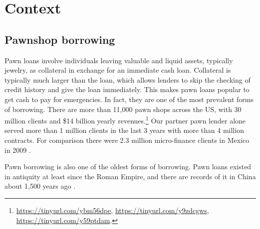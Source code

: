 \documentclass[oneside,11pt]{article}
\begin{document}


\section{Context} \label{context}

\subsection{Pawnshop borrowing}
    
Pawn loans involve individuals leaving valuable and liquid assets, typically jewelry, as collateral in exchange for an immediate cash loan. Collateral is typically much larger than the loan, which allows lenders to skip the checking of credit history and give the loan immediately. This makes pawn loans popular to get cash to pay for emergencies. In fact, they are one of the most prevalent forms of borrowing. There are more than 11,000 pawn shops across the US, with 30 million clients and \$14 billion yearly revenues.\footnote{\url{https://tinyurl.com/ybm56dpe}, \url{https://tinyurl.com/y9zdcgws}, \url{https://tinyurl.com/y59ptdam}.} Our partner pawn lender alone served more than 1 million clients in the last 3 years with more than 4 million contracts. For comparison there were 2.3 million micro-finance clients in Mexico in 2009 \citep{Pedroza:2010}. 

Pawn borrowing is also one of the oldest forms of borrowing. Pawn loans existed in antiquity at least since the Roman Empire, and there are records of it in China about 1,500 years ago \citep{PawnShops}. 

\end{document}

